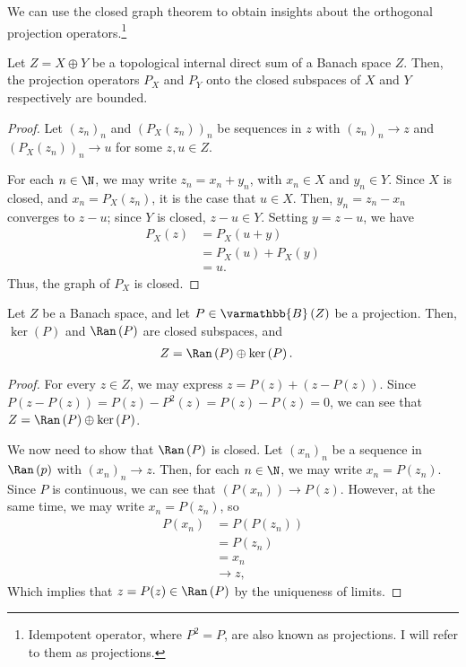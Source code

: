 \documentclass[10pt]{mypackage}
\renewcommand*{\mathbb}[1]{\varmathbb{#1}}
\newcommand{\B}{\mathbb{B}}
\begin{document}
  We can use the closed graph theorem to obtain insights about the orthogonal projection operators.\footnote{Idempotent operator, where $P^2 = P$, are also known as projections. I will refer to them as projections.}
  \begin{proposition}
    Let $Z = X\oplus Y$ be a topological internal direct sum of a Banach space $Z$. Then, the projection operators $P_{X}$ and $P_{Y}$ onto the closed subspaces of $X$ and $Y$ respectively are bounded.
  \end{proposition}
  \begin{proof}
    Let $\left(z_n\right)_n$ and $\left(P_X\left(z_n\right)\right)_n$ be sequences in $z$ with $\left(z_n\right)_n \rightarrow z$ and $\left(P_{X}\left(z_n\right)\right)_n \rightarrow u$ for some $z,u\in Z$.\newline

     For each $n\in \N$, we may write $z_n = x_n + y_n$, with $x_n\in X$ and $y_n \in Y$. Since $X$ is closed, and $x_n = P_X\left(z_n\right)$, it is the case that $u\in X$. Then, $y_n = z_n - x_n$ converges to $z - u$; since $Y$ is closed, $z-u\in Y$. Setting $y = z-u$, we have
     \begin{align*}
       P_X\left(z\right) &= P_X\left(u + y\right)\\
                         &= P_X\left(u\right) + P_X\left(y\right)\\
                        &= u.
     \end{align*}
     Thus, the graph of $P_X$ is closed.
  \end{proof}
  \begin{proposition}
    Let $Z$ be a Banach space, and let $P\in \B\left(Z\right)$ be a projection. Then, $\ker\left(P\right)$ and $\Ran\left(P\right)$ are closed subspaces, and
    \begin{align*}
      Z &= \Ran\left(P\right) \oplus \ker\left(P\right).
    \end{align*}
  \end{proposition}
  \begin{proof}
    For every $z\in Z$, we may express $z = P(z) + \left(z - P(z)\right)$. Since $P\left(z-P(z)\right) = P(z) - P^2\left(z\right) = P(z)-P(z) = 0$, we can see that $Z = \Ran\left(P\right) \oplus \ker\left(P\right)$.\newline

    We now need to show that $\Ran\left(P\right)$ is closed. Let $\left(x_n\right)_n$ be a sequence in $\Ran\left(p\right)$ with $\left(x_n\right)_n\rightarrow z$. Then, for each $n\in \N$, we may write $x_n = P\left(z_n\right)$. Since $P$ is continuous, we can see that $\left(P\left(x_n\right)\right)\rightarrow P\left(z\right)$. However, at the same time, we may write $x_n = P\left(z_n\right)$, so
    \begin{align*}
      P\left(x_n\right) &= P\left(P\left(z_n\right)\right)\\
                        &= P\left(z_n\right)\\
                        &= x_n\\
                        &\rightarrow z,
    \end{align*}
    Which implies that $z = P(z)\in \Ran\left(P\right)$ by the uniqueness of limits.
  \end{proof}
\end{document}
